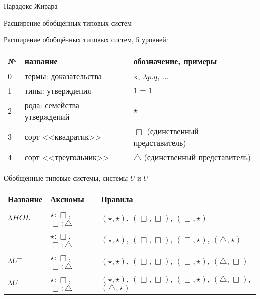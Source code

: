 \documentclass[aspectratio=169,dvipsnames,usenames]{beamer}
\begin{document}
\begin{frame}{}
\begin{center}
{\LARGE Парадокс Жирара}
\end{center}
\end{frame}

\begin{frame}{Расширение обобщённых типовых систем}

Расширение обобщённых типовых систем, 5 уровней:

\vspace{1cm}
\begin{tabular}{lll}
№ & название & обозначение, примеры\\\hline
0 & термы: доказательства & x, $\lambda p.q$, ...\\
1 & типы: утверждения & $1=1$ \\
2 & рода: семейства утверждений & $\star$ \\
3 & сорт <<квадратик>> & $\Box$ (единственный представитель) \\
4 & сорт <<треугольник>> & $\triangle$ (единственный представитель)
\end{tabular}

\end{frame}
\begin{frame}{Обобщённые типовые системы, системы $U$ и $U^-$}

\begin{tabular}{lll}
Название & Аксиомы & Правила\\\hline
$\lambda HOL$ & $\star : \Box$, $\Box : \triangle$ & $(\star,\star)$, $(\Box,\Box)$, $(\Box,\star)$ \\
             & $\star : \Box$, $\Box : \triangle$ & $(\star,\star)$, $(\Box,\Box)$, $(\Box,\star)$, $(\triangle,\star)$ \\\hline
$\lambda U^-$ & $\star : \Box$, $\Box : \triangle$ & $(\star,\star)$, $(\Box,\Box)$, $(\Box,\star)$, $(\triangle,\Box)$ \\
$\lambda U$ & $\star : \Box$, $\Box : \triangle$ & $(\star,\star)$, $(\Box,\Box)$, $(\Box,\star)$, $(\triangle,\Box)$, $(\triangle,\star)$ 
\end{tabular}

\end{frame}
\end{document}
